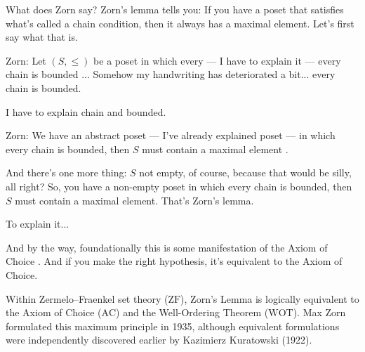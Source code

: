 \begin{speech}[00:36:33 - 00:38:18]
What does Zorn say? Zorn's lemma tells you: If you have a poset that satisfies what's called a chain condition, then it always has a maximal element. Let's first say what that is.

Zorn: Let $(S, \le)$ be a poset in which every --- I have to explain it --- every chain is bounded ... Somehow my handwriting has deteriorated a bit... every chain is bounded.

I have to explain chain and bounded.

Zorn: We have an abstract poset --- I've already explained poset --- in which every chain is bounded, then $S$ must contain a maximal element .

And there's one more thing: $S$ not empty, of course, because that would be silly, all right?  So, you have a non-empty poset in which every chain is bounded, then $S$ must contain a maximal element. That's Zorn's lemma.

To explain it...

And by the way, foundationally this is some manifestation of the Axiom of Choice . And if you make the right hypothesis, it's equivalent to the Axiom of Choice.
\end{speech}

\begin{content}
\end{content}

\begin{aiNote}
Within Zermelo--Fraenkel set theory ($\text{ZF}$), Zorn's Lemma is logically equivalent to the Axiom of Choice ($\text{AC}$) and the Well-Ordering Theorem ($\text{WOT}$). Max Zorn formulated this maximum principle in 1935, although equivalent formulations were independently discovered earlier by Kazimierz Kuratowski (1922).
\end{aiNote}

